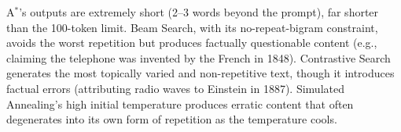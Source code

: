\documentclass[12pt]{article}
\begin{document}
	A$^*$'s outputs are extremely short (2--3 words beyond the prompt), far shorter than the 100-token limit. Beam Search, with its no-repeat-bigram constraint, avoids the worst repetition but produces factually questionable content (e.g., claiming the telephone was invented by the French in 1848). Contrastive Search generates the most topically varied and non-repetitive text, though it introduces factual errors (attributing radio waves to Einstein in 1887). Simulated Annealing's high initial temperature produces erratic content that often degenerates into its own form of repetition as the temperature cools.
	
	\newpage
	
	
	
\end{document}
